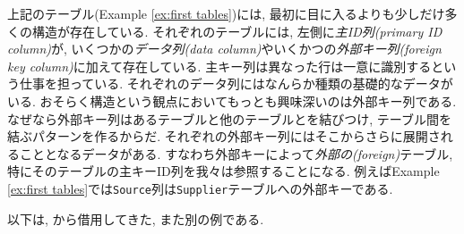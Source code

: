 
上記のテーブル(Example \ref{ex:first tables})には, 最初に目に入るよりも少しだけ多くの構造が存在している. それぞれのテーブルには, 左側に\emph{主ID列(primary ID column)}が, いくつかの\emph{データ列(data column)}やいくかつの\emph{外部キー列(foreign key column)}に加えて存在している. 主キー列は異なった行は一意に識別するという仕事を担っている. それぞれのデータ列にはなんらか種類の基礎的なデータがいる. おそらく構造という観点においてもっとも興味深いのは外部キー列である. なぜなら外部キー列はあるテーブルと他のテーブルとを結びつけ, テーブル間を結ぶパターンを作るからだ. それぞれの外部キー列にはそこからさらに展開されることとなるデータがある. すなわち外部キーによって\emph{外部の(foreign)}テーブル, 特にそのテーブルの主キーID列を我々は参照することになる. 例えばExample \ref{ex:first tables}では\texttt{Source}列は\texttt{Supplier}テーブルへの外部キーである.

以下は, \cite{Sp2}から借用してきた, また別の例である.

